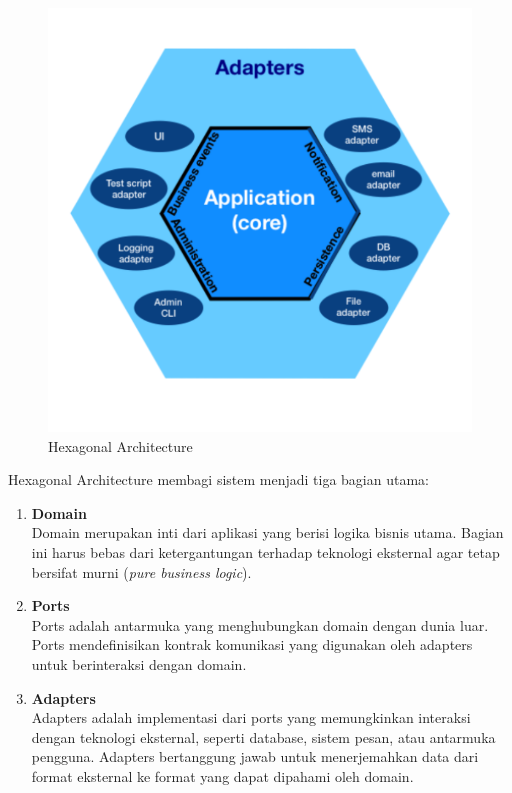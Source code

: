 \begin{figure}[h]
	\centering
	\includegraphics[width=.8\textwidth]{../images/hexagonal_architecture.png}
	\caption{Hexagonal Architecture}
	\label{fig:hexagonal_architecture}
\end{figure}

Hexagonal Architecture membagi sistem menjadi tiga bagian utama:

\begin{enumerate}
	\item \textbf{Domain} \\
	Domain merupakan inti dari aplikasi yang berisi logika bisnis utama. Bagian ini harus bebas dari ketergantungan terhadap teknologi eksternal agar tetap bersifat murni (\textit{pure business logic}).
	
	\item \textbf{Ports} \\
	Ports adalah antarmuka yang menghubungkan domain dengan dunia luar. Ports mendefinisikan kontrak komunikasi yang digunakan oleh adapters untuk berinteraksi dengan domain.
	
	\item \textbf{Adapters} \\
	Adapters adalah implementasi dari ports yang memungkinkan interaksi dengan teknologi eksternal, seperti database, sistem pesan, atau antarmuka pengguna. Adapters bertanggung jawab untuk menerjemahkan data dari format eksternal ke format yang dapat dipahami oleh domain.
\end{enumerate}




